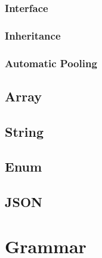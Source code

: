 \documentclass[12pt,letterpaper]{report}
\begin{document}
\subsection{Interface}\label{Interface}
\subsection{Inheritance}\label{Inheritance}
\subsection{Automatic Pooling}\label{Automatic Pooling}
\section{Array}\label{Array}
\section{String}\label{String}
\section{Enum}\label{Enum}
\section{JSON}\label{JSON}
\chapter{Grammar}\label{Grammar}


\end{document}
